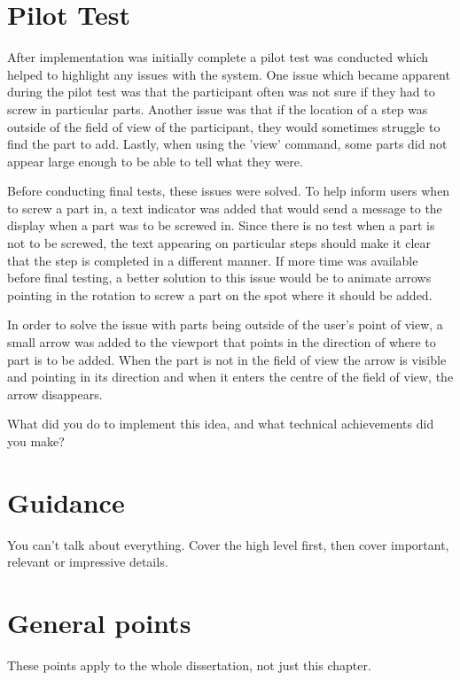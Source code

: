 \documentclass{l4proj}
\begin{document}
\section{Pilot Test}

After implementation was initially complete a pilot test was conducted which helped to highlight any issues with the system. One issue which became apparent during the pilot test was that the participant often was not sure if they had to screw in particular parts. Another issue was that if the location of a step was outside of the field of view of the participant, they would sometimes struggle to find the part to add. Lastly, when using the 'view' command, some parts did not appear large enough to be able to tell what they were.

Before conducting final tests, these issues were solved. To help inform users when to screw a part in, a text indicator was added that would send a message to the display when a part was to be screwed in. Since there is no test when a part is not to be screwed, the text appearing on particular steps should make it clear that the step is completed in a different manner. If more time was available before final testing, a better solution to this issue would be to animate arrows pointing in the rotation to screw a part on the spot where it should be added.

In order to solve the issue with parts being outside of the user's point of view, a small arrow was added to the viewport that points in the direction of where to part is to be added. When the part is not in the field of view the arrow is visible and pointing in its direction and when it enters the centre of the field of view, the arrow disappears.

What did you do to implement this idea, and what technical achievements did you make?
\section{Guidance}
You can't talk about everything. Cover the high level first, then cover important, relevant or impressive details.



\section{General points}

These points apply to the whole dissertation, not just this chapter.
\end{document}
